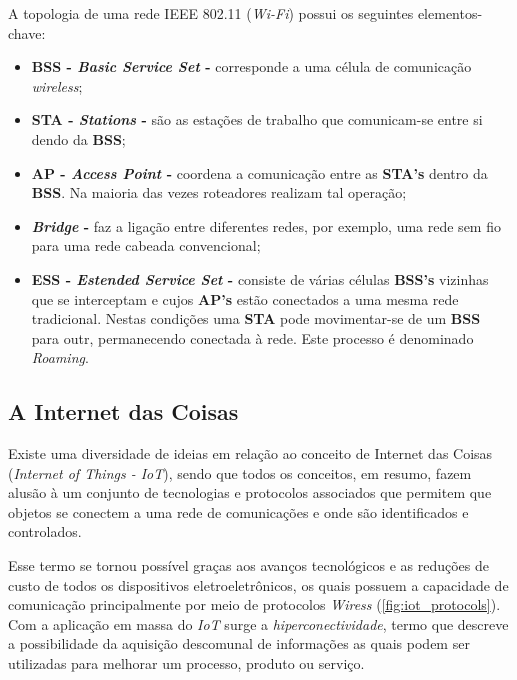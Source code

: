 A topologia de uma rede IEEE 802.11 (\textit{Wi-Fi})  possui os seguintes elementos-chave:

\begin{itemize}
	\item \textbf{BSS - \textit{Basic Service Set} -} corresponde a uma célula de comunicação \textit{wireless};
	\item \textbf{STA - \textit{Stations} -} são as estações de trabalho que comunicam-se entre si dendo da \textbf{BSS};
	\item \textbf{AP - \textit{Access Point} -} coordena a comunicação entre as \textbf{STA's} dentro da \textbf{BSS}. Na maioria das vezes roteadores realizam tal operação;
	\item \textbf{\textit{Bridge} -} faz a ligação entre diferentes redes, por exemplo, uma rede sem fio para uma rede cabeada convencional;
	\item  \textbf{ESS - \textit{Estended Service Set} -} consiste de várias células \textbf{BSS's} vizinhas que se interceptam e cujos \textbf{AP's} estão conectados a uma mesma rede tradicional. Nestas condições uma \textbf{STA} pode movimentar-se de um \textbf{BSS} para outr, permanecendo conectada à rede. Este processo é denominado \textit{Roaming}.
\end{itemize}

\subsection{A Internet das Coisas}

Existe uma diversidade de ideias em relação ao conceito de Internet das Coisas (\textit{Internet of Things - IoT}), sendo que todos os conceitos, em resumo, fazem alusão à um conjunto de tecnologias e protocolos associados que permitem que objetos se conectem a uma rede de comunicações e onde são identificados e controlados.

Esse termo se tornou possível graças aos avanços tecnológicos e as reduções de custo de todos os dispositivos eletroeletrônicos, os quais possuem a capacidade de comunicação principalmente por meio de protocolos \textit{Wiress} (\autoref{fig:iot_protocols}). Com a aplicação em massa do \textit{IoT} surge a \textit{hiperconectividade}, termo que descreve a possibilidade da aquisição descomunal de informações as quais podem ser utilizadas para melhorar um processo, produto ou serviço.

